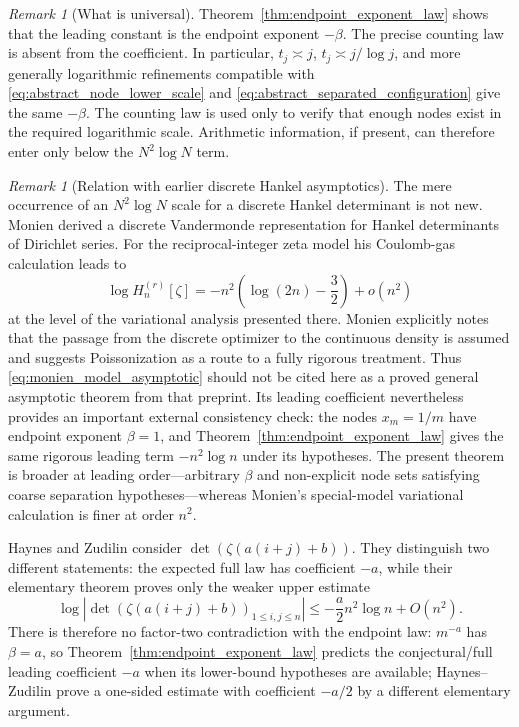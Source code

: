 \documentclass[11pt]{amsart}
\numberwithin{equation}{section}
\theoremstyle{plain}
\theoremstyle{definition}
\theoremstyle{remark}
\newtheorem{remark}[theorem]{Remark}
\begin{document}
\begin{remark}[What is universal]
\label{rem:what_is_universal}
Theorem~\ref{thm:endpoint_exponent_law} shows that the leading constant is the endpoint exponent $-\beta$. The precise counting law is absent from the coefficient. In particular, $t_j\asymp j$, $t_j\asymp j/\log j$, and more generally logarithmic refinements compatible with \eqref{eq:abstract_node_lower_scale} and \eqref{eq:abstract_separated_configuration} give the same $-\beta$. The counting law is used only to verify that enough nodes exist in the required logarithmic scale. Arithmetic information, if present, can therefore enter only below the $N^2\log N$ term.
\end{remark}

\begin{remark}[Relation with earlier discrete Hankel asymptotics]
\label{rem:monien_haynes_position}
The mere occurrence of an $N^2\log N$ scale for a discrete Hankel determinant is not new. Monien \cite{Monien2009} derived a discrete Vandermonde representation for Hankel determinants of Dirichlet series.  For the reciprocal-integer zeta model his Coulomb-gas calculation leads to
\begin{equation}
\log H_n^{(r)}[\zeta]
=-n^2\left(\log(2n)-\frac32\right)+o(n^2)
\label{eq:monien_model_asymptotic}
\end{equation}
at the level of the variational analysis presented there.  Monien explicitly notes that the passage from the discrete optimizer to the continuous density is assumed and suggests Poissonization as a route to a fully rigorous treatment.  Thus \eqref{eq:monien_model_asymptotic} should not be cited here as a proved general asymptotic theorem from that preprint.  Its leading coefficient nevertheless provides an important external consistency check: the nodes $x_m=1/m$ have endpoint exponent $\beta=1$, and Theorem~\ref{thm:endpoint_exponent_law} gives the same rigorous leading term $-n^2\log n$ under its hypotheses.  The present theorem is broader at leading order---arbitrary $\beta$ and non-explicit node sets satisfying coarse separation hypotheses---whereas Monien's special-model variational calculation is finer at order $n^2$.

Haynes and Zudilin \cite{HaynesZudilin2015} consider $\det(\zeta(a(i+j)+b))$.  They distinguish two different statements: the expected full law has coefficient $-a$, while their elementary theorem proves only the weaker upper estimate
\begin{equation}
\log\left|\det(\zeta(a(i+j)+b))_{1\le i,j\le n}\right|
\le-\frac a2 n^2\log n+O(n^2).
\end{equation}
There is therefore no factor-two contradiction with the endpoint law: $m^{-a}$ has $\beta=a$, so Theorem~\ref{thm:endpoint_exponent_law} predicts the conjectural/full leading coefficient $-a$ when its lower-bound hypotheses are available; Haynes--Zudilin prove a one-sided estimate with coefficient $-a/2$ by a different elementary argument.


\end{remark}
\end{document}
